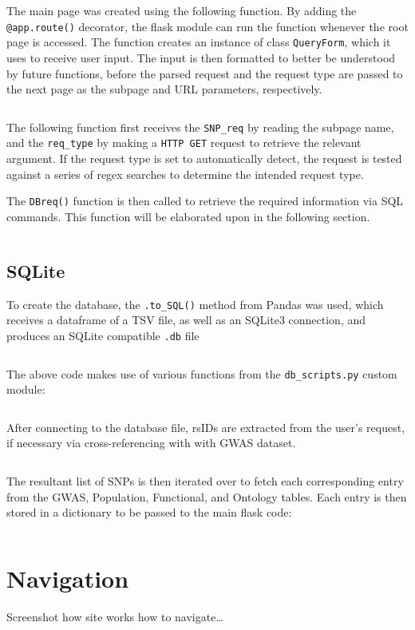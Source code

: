 \documentclass[12pt,a4paper]{article}
\newcommand{\mintfile}[1]{
\begin{tcolorbox}[colback=gray!5!white,%
	grow to left by=20mm,
    grow to right by=20mm,
    sharp corners]{{    \small \inputminted[breaklines]{python}{#1}		}}
\end{tcolorbox}}
\newcommand{\sect}[1]{
\clearpage
\hypertarget{#1}{
\section{#1}\label{#1}}
}
\newcommand{\subsect}[1]{
\FloatBarrier %
\hypertarget{#1}{
\subsection{#1}\label{#1}}
}
\begin{document}
The main page was created using the following function. By adding the \verb|@app.route()| decorator,
the flask module can run the function whenever the root page is accessed.
The function creates an instance of class \texttt{QueryForm}, which it uses to receive user input.
The input is then formatted to better be understood by future functions,
before the parsed request and the request type are passed to the next page as the subpage and URL parameters, respectively.

\mintfile{code_snippets/flask/root.py}

The following function first receives the \texttt{SNP\_req} by reading the subpage name,
and the \texttt{req\_type} by making a \texttt{HTTP GET} request to retrieve the relevant argument.
If the request type is set to automatically detect, the request is tested against a series of
regex searches to determine the intended request type.

The \texttt{DBreq()} function is then called to retrieve the required information via SQL commands. This function will be elaborated upon in the following section.

\mintfile{code_snippets/flask/snp.py}

\subsect{SQLite}

To create the database, the \texttt{.to\_SQL()} method from Pandas was used, which receives a dataframe of a TSV file,
as well as an SQLite3 connection, and produces an SQLite compatible \texttt{.db} file

\mintfile{code_snippets/SQL/create_db.py}
The above code makes use of various functions from the \texttt{db\_scripts.py} custom module:

\mintfile{code_snippets/SQL/pdDB.py}

After connecting to the database file, rsIDs are extracted from the user's request,
if necessary via cross-referencing with with GWAS dataset.

\mintfile{code_snippets/SQL/DBreq1.py}

The resultant list of SNPs is then iterated over to fetch each corresponding entry from the
GWAS, Population, Functional, and Ontology tables.
Each entry is then stored in a dictionary to be passed to the main flask code:

\FloatBarrier

\mintfile{code_snippets/SQL/DBreq2.py}
\FloatBarrier

\sect{Navigation}
Screenshot how site works how to navigate\ldots
\end{document}
